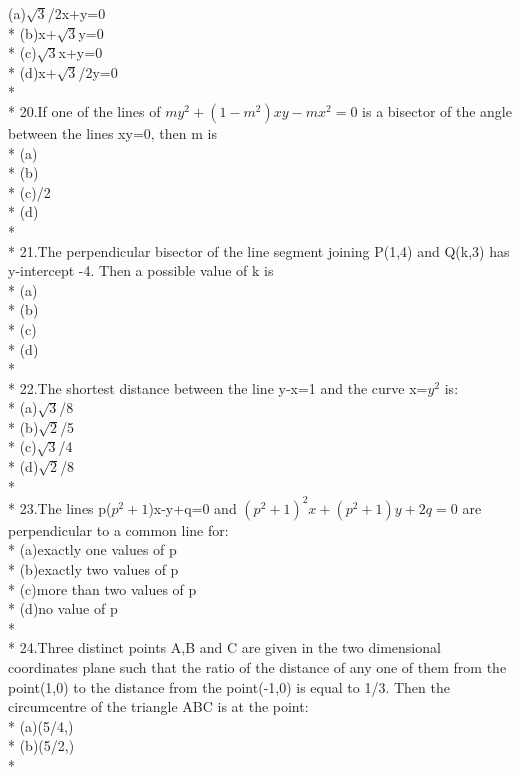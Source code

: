 \documentclass{article}
\begin{document}
{(a)\enspace  $\sqrt3$/2x+y=0\\*
(b)\enspace x+$\sqrt3$y=0\\*
(c)\enspace $\sqrt3$x+y=0\\*
(d)\enspace x+$\sqrt3$/2y=0\\*\\*
20.\enspace If one of the lines of $my^2+(1-m^2)xy-mx^2=0$ is a bisector of the angle between the lines xy=0, then m is \\*
(a) \\*
(b)\\*
(c)/2\\*
(d)\\*\\*
21.\enspace The perpendicular bisector of the line segment joining P(1,4) and Q(k,3) has y-intercept -4. Then a possible value of k is\\*
(a) \\*
(b)\\*
(c)\\*
(d)\\*\\*
22.\enspace The shortest distance between the line y-x=1 and the curve x=$y^2$ is:\\*
(a)$\sqrt3$/8 \\*
(b)$\sqrt2$/5 \\*
(c)\enspace $\sqrt3$/4 \\*
(d)$\sqrt2$/8 \\*\\*
23.\enspace The lines p($p^2+1$)x-y+q=0 and $(p^2+1)^2x+(p^2+1)y+2q=0$ are perpendicular to a common line for:\\*
(a)\enspace exactly one values of p\\*
(b)\enspace exactly two values of p\\*
(c)\enspace more than two values of p\\*
(d)\enspace no value of p\\*\\*
24.\enspace Three distinct points A,B and C are given in the two dimensional coordinates plane such that the ratio of the distance of any one of them from the point(1,0) to the distance from the point(-1,0) is equal to 1/3. Then the circumcentre of the triangle ABC is at the point:\\*
(a)\enspace (5/4,)\\*
(b)\enspace (5/2,)\\*
}
\end{document}
